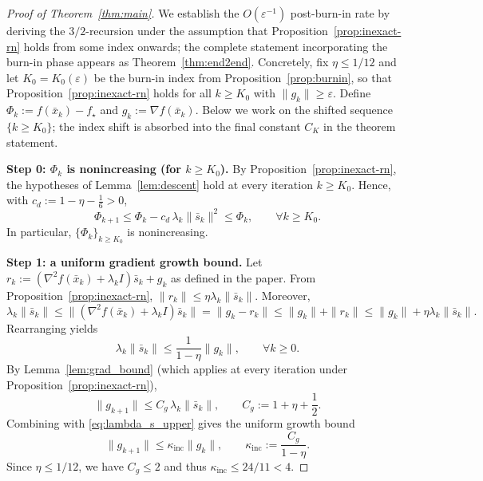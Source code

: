\documentclass[11pt,a4paper]{article}
\def\cO{O}%
\newcommand{\cO}{\mathcal{O}}
\begin{document}
\begin{proof}[Proof of Theorem~\ref{thm:main}]
We establish the $\cO(\varepsilon^{-1})$ post-burn-in rate
by deriving the $3/2$-recursion under the assumption that
Proposition~\ref{prop:inexact-rn} holds from some index onwards;
the complete statement incorporating the burn-in phase appears as
Theorem~\ref{thm:end2end}.
Concretely, fix $\eta\le 1/12$ and let $K_0=K_0(\varepsilon)$ be
the burn-in index from Proposition~\ref{prop:burnin}, so that
Proposition~\ref{prop:inexact-rn} holds for all $k\ge K_0$ with
$\|g_k\|\ge\varepsilon$.
Define $\Phi_k:=f(\bar x_k)-f_\star$ and $g_k:=\nabla f(\bar x_k)$.
Below we work on the shifted sequence $\{k\ge K_0\}$; the
index shift is absorbed into the final constant $C_K$ in the
theorem statement.

\smallskip
\noindent\textbf{Step 0: $\Phi_k$ is nonincreasing (for $k\ge K_0$).}
By Proposition~\ref{prop:inexact-rn}, the hypotheses of Lemma~\ref{lem:descent} hold at every iteration $k\ge K_0$.
Hence, with $c_d:=1-\eta-\frac16>0$,
\begin{equation}\label{eq:Phi_monotone}
\Phi_{k+1}\le \Phi_k - c_d\,\lambda_k\|\bar s_k\|^2\le \Phi_k,
\qquad \forall k\ge K_0.
\end{equation}
In particular, $\{\Phi_k\}_{k\ge K_0}$ is nonincreasing.

\smallskip
\noindent\textbf{Step 1: a uniform gradient growth bound.}
Let $r_k:=(\nabla^2 f(\bar x_k)+\lambda_k I)\bar s_k+g_k$ as defined in the paper.
From Proposition~\ref{prop:inexact-rn}, $\|r_k\|\le \eta\lambda_k\|\bar s_k\|$.
Moreover,
\[
\lambda_k\|\bar s_k\|
\le \|(\nabla^2 f(\bar x_k)+\lambda_k I)\bar s_k\|
=\|g_k-r_k\|
\le \|g_k\|+\|r_k\|
\le \|g_k\|+\eta\lambda_k\|\bar s_k\|.
\]
Rearranging yields
\begin{equation}\label{eq:lambda_s_upper}
\lambda_k\|\bar s_k\|\le \frac{1}{1-\eta}\|g_k\|,\qquad \forall k\ge 0.
\end{equation}
By Lemma~\ref{lem:grad_bound} (which applies at every iteration under Proposition~\ref{prop:inexact-rn}),
\[
\|g_{k+1}\|\le C_g\,\lambda_k\|\bar s_k\|,
\qquad
C_g:=1+\eta+\frac12.
\]
Combining with \eqref{eq:lambda_s_upper} gives the uniform growth bound
\begin{equation}\label{eq:grad_growth}
\|g_{k+1}\|\le \kappa_{\mathrm{inc}}\|g_k\|,
\qquad
\kappa_{\mathrm{inc}}:=\frac{C_g}{1-\eta}.
\end{equation}
Since $\eta\le 1/12$, we have $C_g\le 2$ and thus $\kappa_{\mathrm{inc}}\le 24/11<4$.


\end{proof}
\end{document}
